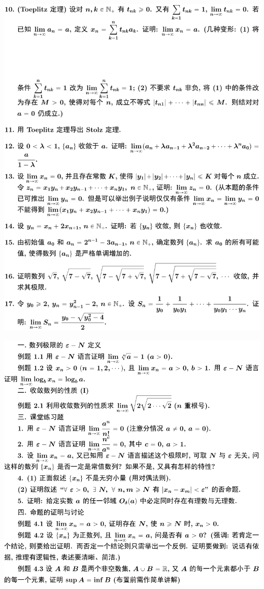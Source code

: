 \documentclass[11pt,a4paper]{ctexart}
\begin{document}
\begin{paracol}{2}
\includegraphics[width=\linewidth]{figure12.png}
\newpage
{}

\includegraphics[width=\linewidth]{figure13.png}
\newpage
{}


\end{paracol}
\end{document}
